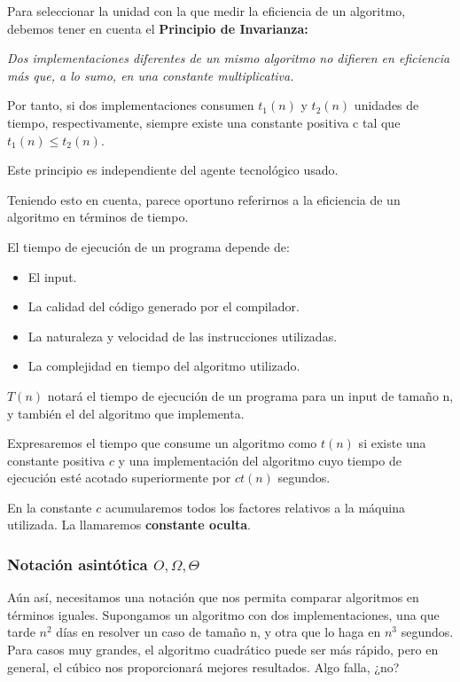 \documentclass[11pt,a4paper]{article}
\begin{document}
\medskip

Para seleccionar la unidad con la que medir la eficiencia de un algoritmo, debemos tener en cuenta el \textbf{Principio de Invarianza:}

\medskip

\textit{Dos implementaciones diferentes de un mismo algoritmo no difieren en eficiencia más que, a lo sumo, en una constante multiplicativa.}

\medskip

Por tanto, si dos implementaciones consumen $t_1(n)$ y $t_2(n)$ unidades de tiempo, respectivamente, siempre existe una constante positiva c tal que $t_1(n) \leq t_2(n)$.

Este principio es independiente del agente tecnológico usado.

\medskip

Teniendo esto en cuenta, parece oportuno referirnos a la eficiencia de un algoritmo en términos de tiempo. 

El tiempo de ejecución de un programa depende de:

\begin{itemize}
\item El input.
\item La calidad del código generado por el compilador.
\item La naturaleza y velocidad de las instrucciones utilizadas.
\item La complejidad en tiempo del algoritmo utilizado.
\end{itemize}

$T(n)$ notará el tiempo de ejecución de un programa para un input de tamaño n, y también el del algoritmo que implementa.

\newpage

Expresaremos el tiempo que consume un algoritmo como $t(n)$ si existe una constante positiva $c$ y una implementación del algoritmo cuyo tiempo de ejecución esté acotado superiormente por $ct(n)$ segundos.

En la constante $c$ acumularemos todos los factores relativos a la máquina utilizada. La llamaremos \textbf{constante oculta}.

\medskip

\subsubsection{Notación asintótica $O, \Omega, \Theta$}

Aún así, necesitamos una notación que nos permita comparar algoritmos en términos iguales. Supongamos un algoritmo con dos implementaciones, una que tarde $n^{2}$ días en resolver un caso de tamaño n, y otra que lo haga en $n^{3}$ segundos. Para casos muy grandes, el algoritmo cuadrático puede ser más rápido, pero en general, el cúbico nos proporcionará mejores resultados. Algo falla, ¿no?
\end{document}
